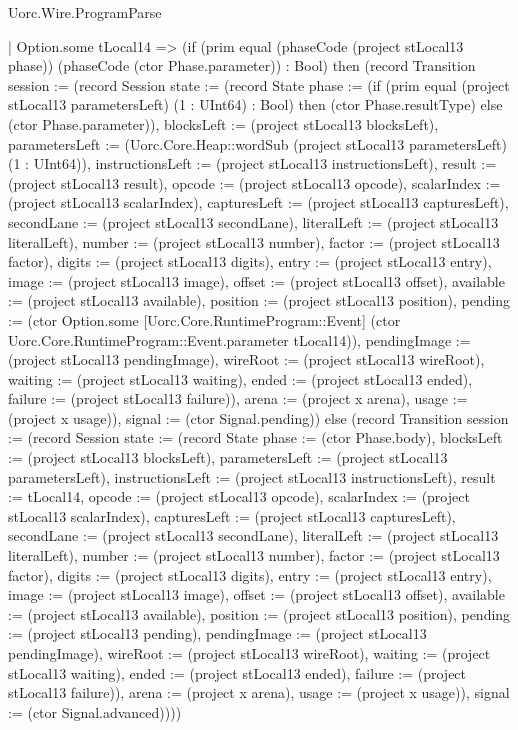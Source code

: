 \begin{lexlean}{Uorc.Wire.ProgramParse}
\begin{semanticmodule}
{      | Option.some tLocal14 => (if (prim equal (phaseCode (project stLocal13 phase)) (phaseCode (ctor Phase.parameter)) : Bool) then (record Transition {session := (record Session {state := (record State {phase := (if (prim equal (project stLocal13 parametersLeft) (1 : UInt64) : Bool) then (ctor Phase.resultType) else (ctor Phase.parameter)), blocksLeft := (project stLocal13 blocksLeft), parametersLeft := (Uorc.Core.Heap::wordSub (project stLocal13 parametersLeft) (1 : UInt64)), instructionsLeft := (project stLocal13 instructionsLeft), result := (project stLocal13 result), opcode := (project stLocal13 opcode), scalarIndex := (project stLocal13 scalarIndex), capturesLeft := (project stLocal13 capturesLeft), secondLane := (project stLocal13 secondLane), literalLeft := (project stLocal13 literalLeft), number := (project stLocal13 number), factor := (project stLocal13 factor), digits := (project stLocal13 digits), entry := (project stLocal13 entry), image := (project stLocal13 image), offset := (project stLocal13 offset), available := (project stLocal13 available), position := (project stLocal13 position), pending := (ctor Option.some [Uorc.Core.RuntimeProgram::Event] (ctor Uorc.Core.RuntimeProgram::Event.parameter tLocal14)), pendingImage := (project stLocal13 pendingImage), wireRoot := (project stLocal13 wireRoot), waiting := (project stLocal13 waiting), ended := (project stLocal13 ended), failure := (project stLocal13 failure)}), arena := (project x arena), usage := (project x usage)}), signal := (ctor Signal.pending)}) else (record Transition {session := (record Session {state := (record State {phase := (ctor Phase.body), blocksLeft := (project stLocal13 blocksLeft), parametersLeft := (project stLocal13 parametersLeft), instructionsLeft := (project stLocal13 instructionsLeft), result := tLocal14, opcode := (project stLocal13 opcode), scalarIndex := (project stLocal13 scalarIndex), capturesLeft := (project stLocal13 capturesLeft), secondLane := (project stLocal13 secondLane), literalLeft := (project stLocal13 literalLeft), number := (project stLocal13 number), factor := (project stLocal13 factor), digits := (project stLocal13 digits), entry := (project stLocal13 entry), image := (project stLocal13 image), offset := (project stLocal13 offset), available := (project stLocal13 available), position := (project stLocal13 position), pending := (project stLocal13 pending), pendingImage := (project stLocal13 pendingImage), wireRoot := (project stLocal13 wireRoot), waiting := (project stLocal13 waiting), ended := (project stLocal13 ended), failure := (project stLocal13 failure)}), arena := (project x arena), usage := (project x usage)}), signal := (ctor Signal.advanced)})))
}
\end{semanticmodule}
\end{lexlean}
